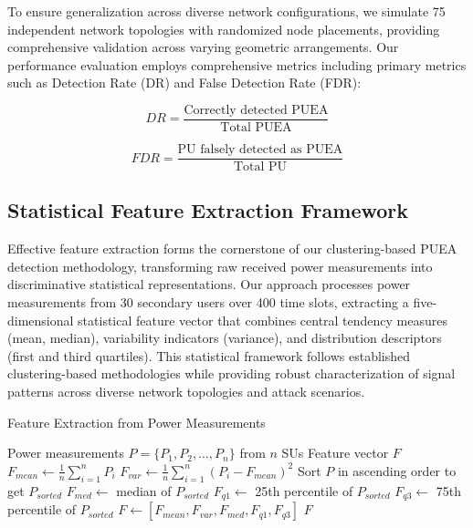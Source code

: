 \documentclass[pdflatex,sn-mathphys-num]{sn-jnl}%
\theoremstyle{thmstyleone}
\theoremstyle{thmstyletwo}
\theoremstyle{thmstylethree}
\begin{document}
To ensure generalization across diverse network configurations, we simulate 75 independent network topologies with randomized node placements, providing comprehensive validation across varying geometric arrangements. Our performance evaluation employs comprehensive metrics including primary metrics such as Detection Rate (DR) and False Detection Rate (FDR):

\begin{equation}
DR = \frac{\text{Correctly detected PUEA}}{\text{Total PUEA}}
\label{eq:detection_rate}
\end{equation}

\begin{equation}
FDR = \frac{\text{PU falsely detected as PUEA}}{\text{Total PU}}
\label{eq:false_detection_rate}
\end{equation}

\subsection{Statistical Feature Extraction Framework}\label{subsec:feature_extraction}

Effective feature extraction forms the cornerstone of our clustering-based PUEA detection methodology, transforming raw received power measurements into discriminative statistical representations. Our approach processes power measurements from 30 secondary users over 400 time slots, extracting a five-dimensional statistical feature vector that combines central tendency measures (mean, median), variability indicators (variance), and distribution descriptors (first and third quartiles). This statistical framework follows established clustering-based methodologies \cite{ref13} while providing robust characterization of signal patterns across diverse network topologies and attack scenarios.

\begin{algorithm}[H]
\caption{Feature Extraction from Power Measurements}
\label{alg:feature_extraction}
\begin{algorithmic}[1]
\Require Power measurements $P = \{P_1, P_2, \ldots, P_n\}$ from $n$ SUs
\Ensure Feature vector $F$
\State $F_{mean} \leftarrow \frac{1}{n}\sum_{i=1}^{n} P_i$
\State $F_{var} \leftarrow \frac{1}{n}\sum_{i=1}^{n}(P_i - F_{mean})^2$
\State Sort $P$ in ascending order to get $P_{sorted}$
\State $F_{med} \leftarrow$ median of $P_{sorted}$
\State $F_{q1} \leftarrow$ 25th percentile of $P_{sorted}$
\State $F_{q3} \leftarrow$ 75th percentile of $P_{sorted}$
\State $F \leftarrow [F_{mean}, F_{var}, F_{med}, F_{q1}, F_{q3}]$
\State \Return $F$
\end{algorithmic}
\end{algorithm}
\end{document}
